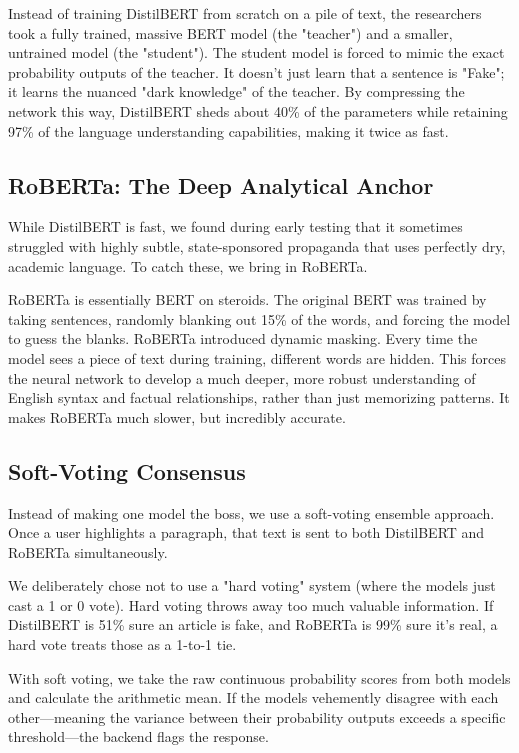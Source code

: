\documentclass[conference]{IEEEtran}
\begin{document}
Instead of training DistilBERT from scratch on a pile of text, the researchers took a fully trained, massive BERT model (the "teacher") and a smaller, untrained model (the "student"). The student model is forced to mimic the exact probability outputs of the teacher. It doesn't just learn that a sentence is "Fake"; it learns the nuanced "dark knowledge" of the teacher. By compressing the network this way, DistilBERT sheds about 40\% of the parameters while retaining 97\% of the language understanding capabilities, making it twice as fast.

\subsection{RoBERTa: The Deep Analytical Anchor}
While DistilBERT is fast, we found during early testing that it sometimes struggled with highly subtle, state-sponsored propaganda that uses perfectly dry, academic language. To catch these, we bring in RoBERTa.

RoBERTa is essentially BERT on steroids. The original BERT was trained by taking sentences, randomly blanking out 15\% of the words, and forcing the model to guess the blanks. RoBERTa introduced dynamic masking. Every time the model sees a piece of text during training, different words are hidden. This forces the neural network to develop a much deeper, more robust understanding of English syntax and factual relationships, rather than just memorizing patterns. It makes RoBERTa much slower, but incredibly accurate.

\subsection{Soft-Voting Consensus}
Instead of making one model the boss, we use a soft-voting ensemble approach. Once a user highlights a paragraph, that text is sent to both DistilBERT and RoBERTa simultaneously. 

We deliberately chose not to use a "hard voting" system (where the models just cast a 1 or 0 vote). Hard voting throws away too much valuable information. If DistilBERT is 51\% sure an article is fake, and RoBERTa is 99\% sure it's real, a hard vote treats those as a 1-to-1 tie. 

With soft voting, we take the raw continuous probability scores from both models and calculate the arithmetic mean. If the models vehemently disagree with each other—meaning the variance between their probability outputs exceeds a specific threshold—the backend flags the response.
\end{document}
